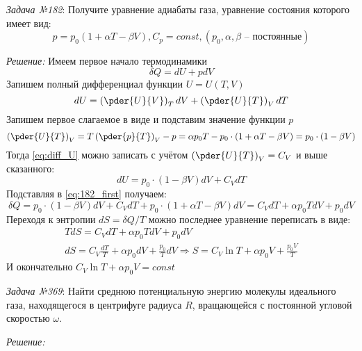 \documentclass[14pt,final,titlepage,pscyr]{hedwork}
\begin{document}
\emph{Задача №182}: Получите уравнение адиабаты газа, уравнение состояния 
которого имеет вид:
\[
	p = p_0\left( 1 + \alpha T - \beta V \right), C_p = const, 
	(p_0, \alpha, \beta \text{ -- постоянные})
\]

\emph{Решение:}
Имеем первое начало термодинамики 
\begin{equation}
	\delta Q = dU + pdV
	\label{eq:182_first}
\end{equation}
Запишем полный дифференциал функции \( U = U(T,V) \)
\begin{equation}
	dU = \left( \pder{U}{V} \right)_T dV + \left( \pder{U}{T} \right)_V dT
	\label{eq:diff_U}
\end{equation}
Запишем первое слагаемое в виде и подставим значение функции \( p \)
\[
	\left( \pder{U}{T} \right)_V = T\left( \pder{p}{T} \right)_V - p = 
		\alpha p_0 T - p_0 \cdot (1+\alpha T-\beta V) = p_0\cdot(1-\beta V)
\]
Тогда \eqref{eq:diff_U} можно записать с учётом 
\( \left( \pder{U}{T} \right)_V = C_V \) и выше сказанного:
\[
	dU = p_0\cdot(1-\beta V)dV + C_V dT
\]
Подставляя в \eqref{eq:182_first} получаем:
\[
	\delta Q = p_0\cdot(1-\beta V)dV + C_V dT + 
		p_0\cdot(1+\alpha T-\beta V)dV = C_V dT + \alpha p_0 T dV + p_0 dV
\]
Переходя к энтропии \( dS = \delta Q / T \) можно последнее уравнение 
переписать в виде:
\begin{gather}
	TdS = C_V dT + \alpha p_0 T dV + p_0 dV \nonumber \\
	dS = C_V \frac{dT}{T} + \alpha p_0 dV + \frac{p_0}{T} dV \Rightarrow 
	S = C_V\ln T + \alpha p_0 V + \frac{p_0 V}{T}
\end{gather}
И окончательно \( C_V \ln T + \alpha p_0 V = const \)
\newpage

\emph{Задача №369}: Найти среднюю потенциальную энергию молекулы идеального 
газа, находящегося в центрифуге радиуса \( R \), вращающейся с постоянной 
угловой скоростью \( \omega \).

\emph{Решение:}
\end{document}
